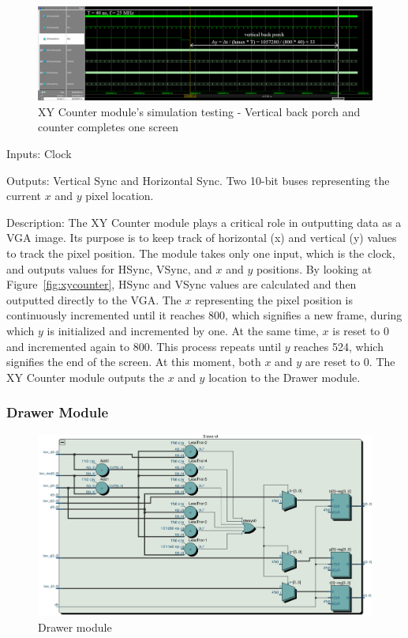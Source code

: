 \documentclass[12pt]{article}
\numberwithin{figure}{subsection}
\begin{document}
\begin{figure}[ht!]
  \centering
  \includegraphics[width=\textwidth]{xycounter_simulation_vertical_back_porch.png}
  \caption{XY Counter module’s simulation testing - Vertical back porch and counter completes one screen}
  \label{fig:xycounter_simulation_vertical_back_porch}
\end{figure}

Inputs: Clock

Outputs: Vertical Sync and Horizontal Sync. Two 10-bit buses representing the current $x$ and $y$ pixel location.

Description: The XY Counter module plays a critical role in outputting data as a VGA image. Its purpose is to keep track of horizontal (x) and vertical (y) values to track the pixel position. The module takes only one input, which is the clock, and outputs values for HSync, VSync, and $x$ and $y$ positions. By looking at Figure~\ref{fig:xycounter}, HSync and VSync values are calculated and then outputted directly to the VGA. The $x$ representing the pixel position is continuously incremented until it reaches 800, which signifies a new frame, during which $y$ is initialized and incremented by one. At the same time, $x$ is reset to 0 and incremented again to 800. This process repeats until $y$ reaches 524, which signifies the end of the screen. At this moment, both $x$ and $y$ are reset to 0. The XY Counter module outputs the $x$ and $y$ location to the Drawer module.

\subsubsection{Drawer Module}

\begin{figure}[ht]
  \centering
  \includegraphics[width=\textwidth]{drawer.jpg}
  \caption{Drawer module}
  \label{fig:drawer}
\end{figure}
\end{document}
